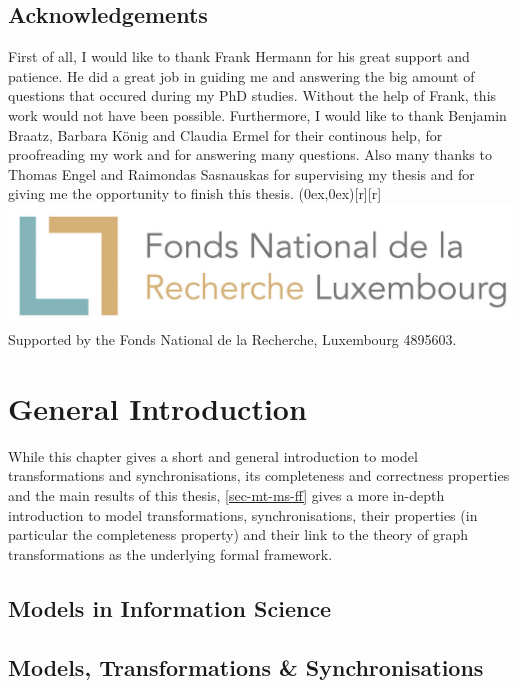 \documentclass{eceasst}
\begin{document}
\section*{Acknowledgements}
First of all, I would like to thank Frank Hermann for his great support and patience. He did a great job in
guiding me and answering the big amount of questions that occured during my PhD studies.
Without the help of Frank, this work would not have been possible.
Furthermore, I would like to thank Benjamin Braatz, Barbara K\"onig and Claudia Ermel for
their continous help, for proofreading my work and for answering many questions.
Also many thanks to Thomas Engel and Raimondas Sasnauskas for supervising my thesis and
for giving me the opportunity to finish this thesis.
\parpic(0ex,0ex)[r][r]{\includegraphics[scale=0.38]{img/FNR_logo.jpg}}
\noindent Supported by the Fonds National de la Recherche, Luxembourg 4895603.

\tableofcontents

\mainmatter

\chapter{General Introduction}
\label{sec-gen-intro}

While this chapter gives a short and general introduction to model transformations and synchronisations, its completeness and correctness properties and the main results of this thesis, \cref{sec-mt-ms-ff} gives a more in-depth introduction to model transformations, synchronisations, their properties (in particular the completeness property) and their link to the theory of graph transformations as the underlying formal framework.

\section{Models in Information Science}
\label{sec-gen-intro-models}


\section{Models, Transformations \& Synchronisations}
\label{sec-gen-intro-trafos}

\end{document}
